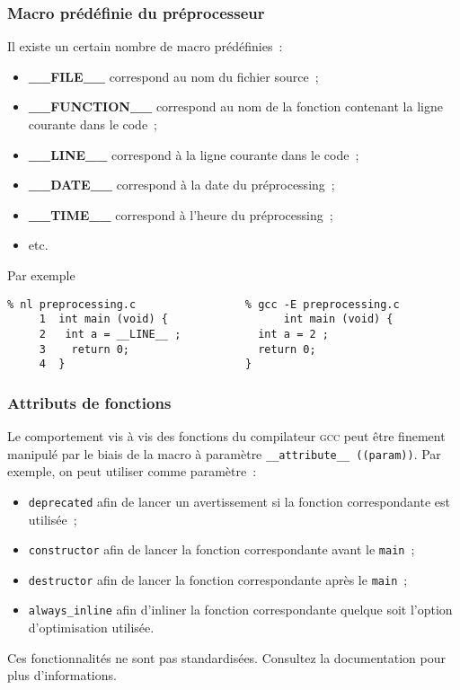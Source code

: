 \begin{frame}[fragile]
  \frametitle{Macro pr\'ed\'efinie du pr\'eprocesseur}%
  Il existe un certain nombre de macro pr\'ed\'efinies~:
  \begin{itemize}
  \item\textbf{\_\_FILE\_\_} correspond au nom du fichier source~;
  \item\textbf{\_\_FUNCTION\_\_} correspond au nom de la fonction
    contenant la ligne courante dans le code~;
  \item\textbf{\_\_LINE\_\_} correspond \`a la ligne courante dans le code~;
  \item\textbf{\_\_DATE\_\_} correspond \`a la date du pr\'eprocessing~;
  \item\textbf{\_\_TIME\_\_} correspond \`a l'heure du pr\'eprocessing~;
  \item etc.    
  \end{itemize}
  Par exemple
\begin{verbatim}
% nl preprocessing.c                 % gcc -E preprocessing.c   
     1  int main (void) {                  int main (void) {               
     2   int a = __LINE__ ;            int a = 2 ;             
     3    return 0;                    return 0;               
     4  }                            }                         
\end{verbatim}
\end{frame}
\begin{frame}[fragile]
 \frametitle{Attributs de fonctions}%
  Le comportement vis \`a vis des fonctions du compilateur \textsc{gcc} peut \^etre finement manipul\'e 
  par le biais de la macro \`a param\`etre \verb+__attribute__ ((param))+. 
  Par exemple,  on peut utiliser comme param\`etre~:
\begin{itemize}
\item \verb+deprecated+ afin de lancer un avertissement si la fonction correspondante est utilis\'ee~;
\item \verb+constructor+ afin de lancer la fonction correspondante avant le \texttt{main}~;
\item \verb+destructor+ afin de lancer la fonction correspondante apr\`es le \texttt{main}~;
\item \verb+always_inline+ afin d'inliner la fonction correspondante quelque soit l'option d'optimisation utilis\'ee.
\end{itemize}
  Ces fonctionnalit\'es ne sont pas standardis\'ees. Consultez la documentation pour plus d'informations.
\end{frame}
